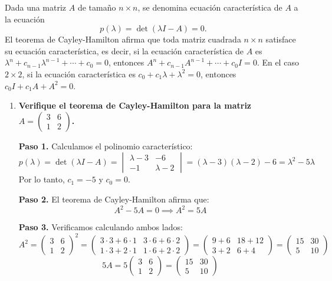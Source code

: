 \begin{prob}
Dada una matriz $A$ de tamaño $n\times n$, se denomina ecuación característica de $A$ a la ecuación
\[
p(\lambda) = \det(\lambda I - A) = 0.
\]
El teorema de Cayley-Hamilton afirma que toda matriz cuadrada $n \times n$ satisface su ecuación característica, es decir, si la ecuación característica de $A$ es $\lambda^n + c_{n-1}\lambda^{n-1} + \cdots + c_0 = 0$, entonces $A^n + c_{n-1}A^{n-1} + \cdots + c_0 I = 0$. En el caso $2 \times 2$, si la ecuación característica es $c_0 + c_1\lambda + \lambda^2 = 0$, entonces $c_0 I + c_1 A + A^2 = 0$.
\begin{enumerate}[$a)$]
\item \textbf{Verifique el teorema de Cayley-Hamilton para la matriz $A = \begin{pmatrix} 3 & 6 \\ 1 & 2 \end{pmatrix}$.}
\begin{myproof}
\textbf{Paso 1.} Calculamos el polinomio característico:
\[
p(\lambda) = \det(\lambda I - A) =
\begin{vmatrix}
\lambda - 3 & -6 \\
-1 & \lambda - 2
\end{vmatrix}
= (\lambda - 3)(\lambda - 2) - 6 = \lambda^2 - 5\lambda
\]
Por lo tanto, $c_1 = -5$ y $c_0 = 0$.

\textbf{Paso 2.} El teorema de Cayley-Hamilton afirma que:
\[
A^2 - 5A = 0 \implies A^2 = 5A
\]

\textbf{Paso 3.} Verificamos calculando ambos lados:
\[
A^2 = \begin{pmatrix} 3 & 6 \\ 1 & 2 \end{pmatrix}^2 = \begin{pmatrix} 3\cdot3 + 6\cdot1 & 3\cdot6 + 6\cdot2 \\ 1\cdot3 + 2\cdot1 & 1\cdot6 + 2\cdot2 \end{pmatrix}
= \begin{pmatrix} 9 + 6 & 18 + 12 \\ 3 + 2 & 6 + 4 \end{pmatrix}
= \begin{pmatrix} 15 & 30 \\ 5 & 10 \end{pmatrix}
\]
\[
5A = 5\begin{pmatrix} 3 & 6 \\ 1 & 2 \end{pmatrix} = \begin{pmatrix} 15 & 30 \\ 5 & 10 \end{pmatrix}
\]


\end{myproof}
\end{enumerate}
\end{prob}
